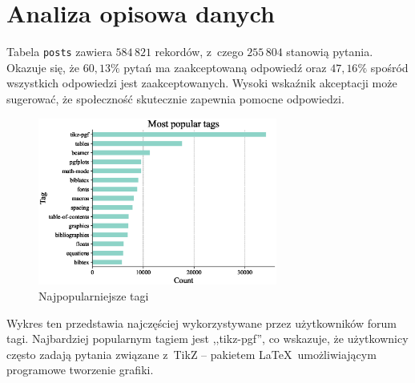 \documentclass[12pt]{article}
\begin{document}
	\section{Analiza opisowa danych}\label{sec:analiza-opisowa-danych}
	Tabela \verb|posts| zawiera $584\,821$ rekordów, z~czego $255\,804$ stanowią pytania.
	Okazuje się, że $60,13\%$ pytań ma zaakceptowaną odpowiedź oraz $47,16\%$ spośród wszystkich odpowiedzi jest zaakceptowanych.
	Wysoki wskaźnik akceptacji może sugerować, że społeczność skutecznie zapewnia pomocne odpowiedzi.

	\begin{figure}[H]
		\centering
		\includegraphics[width=0.7\textwidth]{tags_popularity}
		\caption{Najpopularniejsze tagi}
		\label{fig:most-popular-tags}
	\end{figure}
	Wykres ten przedstawia najczęściej wykorzystywane przez użytkowników forum tagi.
	Najbardziej popularnym tagiem jest ,,tikz-pgf'', co wskazuje, że użytkownicy często zadają pytania związane z~TikZ -- pakietem \LaTeX~umożliwiającym programowe tworzenie grafiki.
\end{document}

